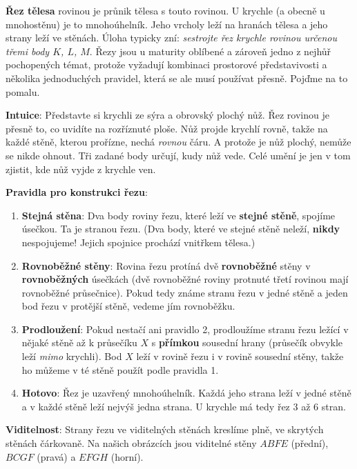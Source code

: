 \textbf{Řez tělesa} rovinou je průnik tělesa s touto rovinou. U krychle (a obecně u mnohostěnu) je to mnohoúhelník. Jeho vrcholy leží na hranách tělesa a jeho strany leží ve stěnách. Úloha typicky zní: \textit{sestrojte řez krychle rovinou určenou třemi body $K$, $L$, $M$}. Řezy jsou u maturity oblíbené a zároveň jedno z nejhůř pochopených témat, protože vyžadují kombinaci prostorové představivosti a několika jednoduchých pravidel, která se ale musí používat přesně. Pojďme na to pomalu.

\textbf{Intuice}: Představte si krychli ze sýra a obrovský plochý nůž. Řez rovinou je přesně to, co uvidíte na rozříznuté ploše. Nůž projde krychlí rovně, takže na každé stěně, kterou prořízne, nechá \textit{rovnou} čáru. A protože je nůž plochý, nemůže se nikde ohnout. Tři zadané body určují, kudy nůž vede. Celé umění je jen v tom zjistit, kde nůž vyjde z krychle ven.

\begin{definitionbox}
  \textbf{Pravidla pro konstrukci řezu}:
  \begin{enumerate}
    \item \textbf{Stejná stěna}: Dva body roviny řezu, které leží ve \textbf{stejné stěně}, spojíme úsečkou. Ta je stranou řezu. (Dva body, které ve stejné stěně neleží, \textbf{nikdy} nespojujeme! Jejich spojnice prochází vnitřkem tělesa.)
    \item \textbf{Rovnoběžné stěny}: Rovina řezu protíná dvě \textbf{rovnoběžné} stěny v \textbf{rovnoběžných} úsečkách (dvě rovnoběžné roviny protnuté třetí rovinou mají rovnoběžné průsečnice). Pokud tedy známe stranu řezu v jedné stěně a jeden bod řezu v protější stěně, vedeme jím rovnoběžku.
    \item \textbf{Prodloužení}: Pokud nestačí ani pravidlo 2, prodloužíme stranu řezu ležící v nějaké stěně až k průsečíku $X$ s \textbf{přímkou} sousední hrany (průsečík obvykle leží \textit{mimo} krychli). Bod $X$ leží v rovině řezu i v rovině sousední stěny, takže ho můžeme v té stěně použít podle pravidla 1.
    \item \textbf{Hotovo}: Řez je uzavřený mnohoúhelník. Každá jeho strana leží v jedné stěně a v každé stěně leží nejvýš jedna strana. U krychle má tedy řez $3$ až $6$ stran.
  \end{enumerate}
  \textbf{Viditelnost}: Strany řezu ve viditelných stěnách kreslíme plně, ve skrytých stěnách čárkovaně. Na našich obrázcích jsou viditelné stěny $ABFE$ (přední), $BCGF$ (pravá) a $EFGH$ (horní).
\end{definitionbox}


